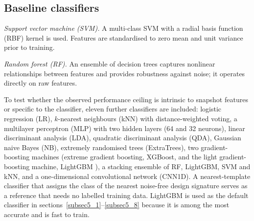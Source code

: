 \documentclass[11pt]{article}
\newenvironment{nw}{}{}
\begin{document}
\subsection{Baseline classifiers}\label{subsec3_3}

\textit{Support vector machine (SVM).} A multi-class SVM with a radial basis function (RBF) kernel is used. Features are standardised to zero mean and unit variance prior to training.

\textit{Random forest (RF).} An ensemble of decision trees captures nonlinear relationships between features and provides robustness against noise; it operates directly on raw features.

\begin{nw}
To test whether the observed performance ceiling is intrinsic to snapshot features or specific to the classifier, eleven further classifiers are included: logistic regression (LR), $k$-nearest neighbours (kNN) with distance-weighted voting, a multilayer perceptron (MLP) with two hidden layers (64 and 32 neurons), linear discriminant analysis (LDA), quadratic discriminant analysis (QDA), Gaussian naive Bayes (NB), extremely randomised trees (ExtraTrees), two gradient-boosting machines (extreme gradient boosting, XGBoost, and the light gradient-boosting machine, LightGBM \cite{lightgbm,sapountzoglou2020}), a stacking ensemble of RF, LightGBM, SVM and kNN, and a one-dimensional convolutional network (CNN1D). A nearest-template classifier that assigns the class of the nearest noise-free design signature serves as a reference that needs no labelled training data. LightGBM is used as the default classifier in sections~\ref{subsec5_1}--\ref{subsec5_8} because it is among the most accurate and is fast to train.
\end{nw}
\end{document}
